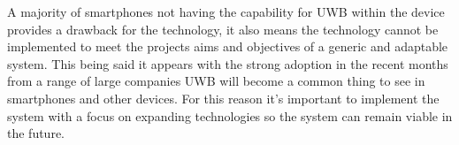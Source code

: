 A majority of smartphones not having the capability for UWB within the device provides a drawback for the technology, it also means the technology cannot be implemented to meet the projects aims and objectives of a generic and adaptable system. This being said it appears with the strong adoption in the recent months from a range of large companies UWB will become a common thing to see in smartphones and other devices. For this reason it's important to implement the system with a focus on expanding technologies so the system can remain viable in the future.\\

